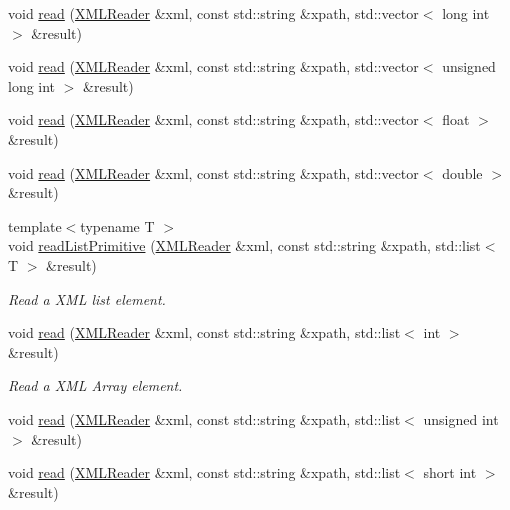 \begin{DoxyCompactItemize}
\item 
void \mbox{\hyperlink{group__io_gaad4f8586d1c41ae7f0c32a40754623f5}{read}} (\mbox{\hyperlink{classADATXML_1_1XMLReader}{X\+M\+L\+Reader}} \&xml, const std\+::string \&xpath, std\+::vector$<$ long int $>$ \&result)
\item 
void \mbox{\hyperlink{group__io_ga04a1d8c6fa265cdf5824019b4f94844f}{read}} (\mbox{\hyperlink{classADATXML_1_1XMLReader}{X\+M\+L\+Reader}} \&xml, const std\+::string \&xpath, std\+::vector$<$ unsigned long int $>$ \&result)
\item 
void \mbox{\hyperlink{group__io_ga161a35ac40c7f85342a454fbc17e2dad}{read}} (\mbox{\hyperlink{classADATXML_1_1XMLReader}{X\+M\+L\+Reader}} \&xml, const std\+::string \&xpath, std\+::vector$<$ float $>$ \&result)
\item 
void \mbox{\hyperlink{group__io_ga49fa13abbc0b2a2273c58d328d1e7d70}{read}} (\mbox{\hyperlink{classADATXML_1_1XMLReader}{X\+M\+L\+Reader}} \&xml, const std\+::string \&xpath, std\+::vector$<$ double $>$ \&result)
\item 
{\footnotesize template$<$typename T $>$ }\\void \mbox{\hyperlink{namespaceADATXML_ad39ebe1fb986ec4121572e877b5dacb8}{read\+List\+Primitive}} (\mbox{\hyperlink{classADATXML_1_1XMLReader}{X\+M\+L\+Reader}} \&xml, const std\+::string \&xpath, std\+::list$<$ T $>$ \&result)
\begin{DoxyCompactList}\small\item\em Read a X\+ML list element. \end{DoxyCompactList}\item 
void \mbox{\hyperlink{group__io_gab7d805fe66e6e3f1f897d4dabd3b29ad}{read}} (\mbox{\hyperlink{classADATXML_1_1XMLReader}{X\+M\+L\+Reader}} \&xml, const std\+::string \&xpath, std\+::list$<$ int $>$ \&result)
\begin{DoxyCompactList}\small\item\em Read a X\+ML Array element. \end{DoxyCompactList}\item 
void \mbox{\hyperlink{group__io_gab76dffc06569f27474fb03e08b372393}{read}} (\mbox{\hyperlink{classADATXML_1_1XMLReader}{X\+M\+L\+Reader}} \&xml, const std\+::string \&xpath, std\+::list$<$ unsigned int $>$ \&result)
\item 
void \mbox{\hyperlink{group__io_gaf316ff420b43fcc4c23590001af57c66}{read}} (\mbox{\hyperlink{classADATXML_1_1XMLReader}{X\+M\+L\+Reader}} \&xml, const std\+::string \&xpath, std\+::list$<$ short int $>$ \&result)
\item 

\end{DoxyCompactItemize}
